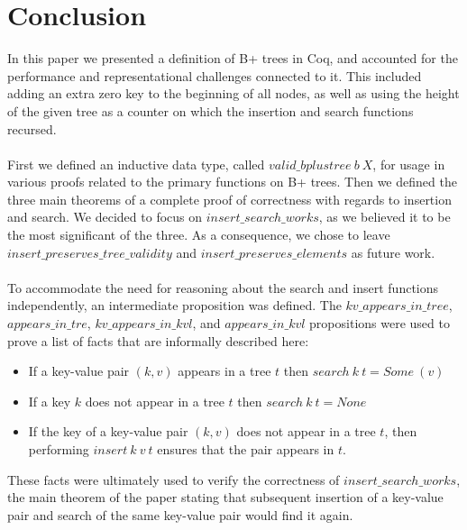 \section{Conclusion}
\label{sec:Conclusion}
In this paper we presented a definition of B+ trees in Coq, and accounted for the performance and representational challenges connected to it. This included adding an extra zero key to the beginning of all nodes, as well as using the height of the given tree as a counter on which the insertion and search functions recursed. 
\paragraph{}
First we defined an inductive data type, called $valid\_bplustree~b~X$, for usage in various proofs related to the primary functions on B+ trees. Then we defined the three main theorems of a complete proof of correctness with regards to insertion and search. We decided to focus on $insert\_search\_works$, as we believed it to be the most significant of the three. As a consequence, we chose to leave $insert\_preserves\_tree\_validity$ and $insert\_preserves\_elements$ as future work.
\paragraph{}
To accommodate the need for reasoning about the search and insert functions independently, an intermediate proposition was defined. The $kv\_appears\_in\_tree$, $appears\_in\_tre$, $kv\_appears\_in\_kvl$, and $appears\_in\_kvl$ propositions were used to prove a list of facts that are informally described here:

\begin{itemize}
	\item If a key-value pair $(k, v)$ appears in a tree $t$ then $search~k~t = Some~(v)$
	\item If a key $k$ does not appear in a tree $t$ then $search~k~t = None$
	\item If the key of a key-value pair $(k, v)$ does not appear in a tree $t$, then performing $insert~k~v~t$ ensures that the pair appears in $t$.
\end{itemize} 

These facts were ultimately used to verify the correctness of $insert\allowbreak{}\_search\allowbreak{}\_works$, the main theorem of the paper stating that subsequent insertion of a key-value pair and search of the same key-value pair would find it again.
